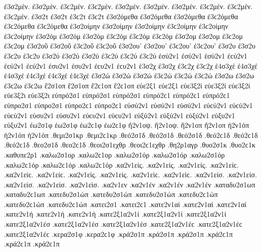 {%
ἐ3σ2μὲν. ἐ3σ2μὲν. ἐ3ϲ2μὲν. ἐ3ϲ2μὲν. ἐ3σ2μέν. ἐ3σ2μέν. ἐ3σ2μέν. ἐ3ϲ2μέν. ἐ3ϲ2μέν. ἐ3ϲ2μέν.   %
ἐ3σ2τ ἐ3σ2τ ἐ3ϲ2τ ἐ3ϲ2τ 
ἐ3σ2όμεθα ἐ3σ2όμεθα ἐ3σ2όμεθα ἐ3ϲ2όμεθα ἐ3ϲ2όμεθα ἐ3ϲ2όμεθα 
ἐ3σ2οίμην ἐ3σ2οίμην ἐ3σ2οίμην ἐ3ϲ2οίμην ἐ3ϲ2οίμην ἐ3ϲ2οίμην 
ἐ3σ2όμ ἐ3σ2όμ ἐ3σ2όμ ἐ3ϲ2όμ ἐ3ϲ2όμ ἐ3ϲ2όμ   %
ἐ3σ2ομ ἐ3σ2ομ ἐ3ϲ2ομ ἐ3ϲ2ομ 
ἐ3σ2οῦ ἐ3σ2οῦ ἐ3ϲ2οῦ ἐ3ϲ2οῦ   %
ἐ3σ2ου' ἐ3σ2ου' ἐ3ϲ2ου' ἐ3ϲ2ου' 
%
ἐ3σ2υ ἐ3σ2υ ἐ3ϲ2υ ἐ3ϲ2υ   %
ἐ3σ2ύ ἐ3σ2ύ ἐ3σ2ύ ἐ3ϲ2ύ ἐ3ϲ2ύ ἐ3ϲ2ύ 
ἐσύ2ν1 ἐσύ2ν1 ἐσύ2ν1 ἐϲύ2ν1 ἐϲύ2ν1 ἐϲύ2ν1   %
ἐσυ2ν1 ἐσυ2ν1 ἐϲυ2ν1 ἐϲυ2ν1 
ἐ3σ2χ ἐ3σ2χ ἐ3ϲ2χ ἐ3ϲ2χ 
ἐ4σ3χέ ἐ4σ3χέ ἐ4σ3χέ ἐ4ϲ3χέ ἐ4ϲ3χέ ἐ4ϲ3χέ   %
ἐ3σ2ώ ἐ3σ2ώ ἐ3σ2ώ ἐ3ϲ2ώ ἐ3ϲ2ώ ἐ3ϲ2ώ 
ἐ3σ2ω ἐ3σ2ω ἐ3ϲ2ω ἐ3ϲ2ω 
ἔ2σ1οπ ἔ2σ1οπ ἔ2ϲ1οπ ἔ2ϲ1οπ   %
εὐε2ξ1 εὐε2ξ1   %
εὐε3ξ2ί εὐε3ξ2ί εὐε3ξ2ί   %
εὐε3ξ2ι εὐε3ξ2ι 
εὐπρό2σ1 εὐπρό2σ1 εὐπρό2σ1 εὐπρό2ϲ1 εὐπρό2ϲ1 εὐπρό2ϲ1   %
εὐπρο2σ1 εὐπρο2σ1 εὐπρο2ϲ1 εὐπρο2ϲ1 
εὐσύ2ν1 εὐσύ2ν1 εὐσύ2ν1 εὐϲύ2ν1 εὐϲύ2ν1 εὐϲύ2ν1   %
εὐσυ2ν1 εὐσυ2ν1 εὐϲυ2ν1 εὐϲυ2ν1 
εὐξύ2ν1 εὐξύ2ν1 εὐξύ2ν1   %
εὐξυ2ν1 εὐξυ2ν1 
ἐω2σ1φ ἐω2σ1φ ἐω2ϲ1φ ἐω2ϲ1φ   %
ἤ2ν1οψ. ἤ2ν1οψ.   %
ἤ2ν1οπ ἤ2ν1οπ 
ἠ2ν1όπ ἠ2ν1όπ ἠ2ν1όπ 
.θεμι2σ1κρ .θεμι2ϲ1κρ   %
.θεό2σ1δ .θεό2σ1δ .θεό2σ1δ .θεό2ϲ1δ .θεό2ϲ1δ .θεό2ϲ1δ   %
.θεο2σ1δ .θεο2ϲ1δ 
.θεοι2σ1εχθρ .θεοι2ϲ1εχθρ   %
.θη2ρ1αγρ   %
.θυο2σ1κ .θυο2ϲ1κ   %
.καθυπε2ρ1   %
.καλω2σ1ορ .καλω2ϲ1ορ   %
.καλω2σ1όρ .καλω2σ1όρ .καλω2σ1όρ .καλω2ϲ1όρ .καλω2ϲ1όρ .καλω2ϲ1όρ 
.κα2ν1είς. .κα2ν1είς. .κα2ν1είς. .κα2ν1είϲ. .κα2ν1είϲ. .κα2ν1είϲ.   %
.κα2ν1εὶς. .κα2ν1εὶς. .κα2ν1εὶϲ. .κα2ν1εὶϲ. 
.κα2ν1είσ. .κα2ν1είσ. .κα2ν1είσ. 
.κα2ν1εὶσ. .κα2ν1εὶσ. 
.κα2ν1εν 
.κα2ν1έν .κα2ν1έν .κα2ν1έν 
.καταδυ2σ1ωπ .καταδυ2ϲ1ωπ   %
.κατεδυ2σ1ώπ .κατεδυ2σ1ώπ .κατεδυ2σ1ώπ .κατεδυ2ϲ1ώπ .κατεδυ2ϲ1ώπ .κατεδυ2ϲ1ώπ   %
.κατει2σ1 .κατει2ϲ1   %
.κατε2ν1αί .κατε2ν1αί .κατε2ν1αί   %
.κατε2ν1ή .κατε2ν1ή .κατε2ν1ή   %
.κατε2ξ1α2ν1ί .κατε2ξ1α2ν1ί .κατε2ξ1α2ν1ί   %
.κατε2ξ1α2ν1έσ .κατε2ξ1α2ν1έσ .κατε2ξ1α2ν1έσ .κατε2ξ1α2ν1έϲ .κατε2ξ1α2ν1έϲ .κατε2ξ1α2ν1έϲ   %
.κερα2σ1φ .κερα2ϲ1φ   %
.κρά2σ1π .κρά2σ1π .κρά2σ1π .κρά2ϲ1π .κρά2ϲ1π .κρά2ϲ1π   %
}
